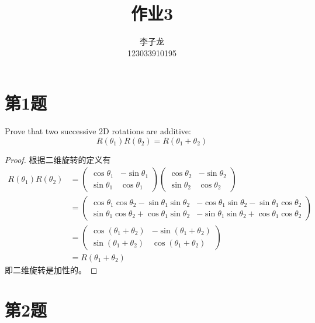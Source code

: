 \documentclass[math-font=newcm]{sjtuarticle}
\title{作业3}
\author{李子龙\\123033910195}
\begin{document}
\maketitle

\tableofcontents*

\section{第1题}

Prove that two successive 2D rotations are additive:
\begin{equation}
    R(\theta_1) R(\theta_2) = R(\theta_1 + \theta_2) 
\end{equation}

\begin{proof}
    根据二维旋转的定义有
    \begin{align*}
        R(\theta_1)R(\theta_2)&=\begin{pmatrix}
            \cos\theta_1 & -\sin\theta_1 \\
            \sin\theta_1 & \cos\theta_1
        \end{pmatrix}\begin{pmatrix}
            \cos\theta_2 & -\sin\theta_2 \\
            \sin\theta_2 & \cos\theta_2
        \end{pmatrix} \\
        &=\begin{pmatrix}
            \cos\theta_1\cos\theta_2-\sin\theta_1\sin\theta_2 &
            -\cos\theta_1\sin\theta_2-\sin\theta_1\cos\theta_2 \\
            \sin\theta_1\cos\theta_2+\cos\theta_1\sin\theta_2 &
            -\sin\theta_1\sin\theta_2+\cos\theta_1\cos\theta_2
        \end{pmatrix} \\
        &=\begin{pmatrix}
            \cos(\theta_1+\theta_2) & -\sin(\theta_1+\theta_2) \\
            \sin(\theta_1+\theta_2) & \cos(\theta_1+\theta_2)
        \end{pmatrix}\\
        &=R(\theta_1+\theta_2)
    \end{align*}
    即二维旋转是加性的。
\end{proof}

\section{第2题}
\end{document}
